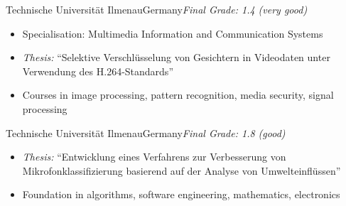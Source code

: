 \documentclass[11pt,a4paper,sans]{moderncv}
\begin{document}
%
  {Technische Universit\"at Ilmenau}{Germany}{\textit{Final Grade: 1.4 (very good)}}%
  {\begin{itemize}[nosep, leftmargin=1.2em, topsep=2pt]
     \item[\textendash] Specialisation: Multimedia Information and Communication Systems
     \item[\textendash] \textit{Thesis:} ``Selektive Verschl\"usselung von Gesichtern in Videodaten unter Verwendung des H.264-Standards''
     \item[\textendash] Courses in image processing, pattern recognition, media security, signal processing
   \end{itemize}}

%
  {Technische Universit\"at Ilmenau}{Germany}{\textit{Final Grade: 1.8 (good)}}%
  {\begin{itemize}[nosep, leftmargin=1.2em, topsep=2pt]
     \item[\textendash] \textit{Thesis:} ``Entwicklung eines Verfahrens zur Verbesserung von Mikrofonklassifizierung basierend auf der Analyse von Umwelteinfl\"ussen''
     \item[\textendash] Foundation in algorithms, software engineering, mathematics, electronics
   \end{itemize}}


\end{document}
